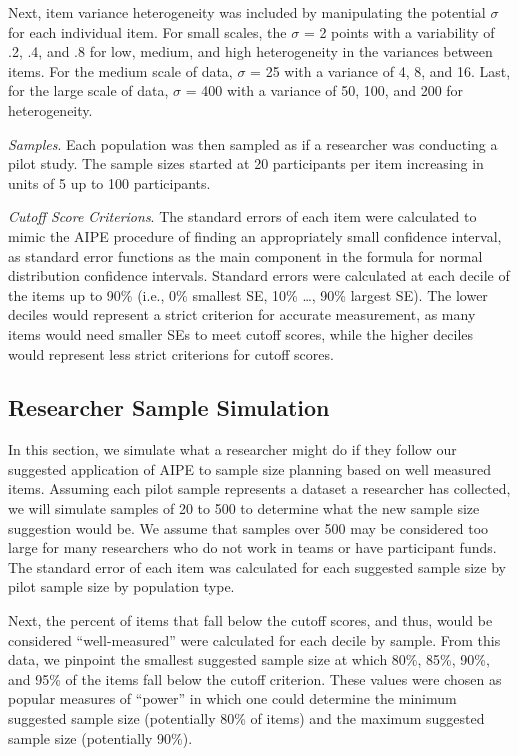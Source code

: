 \documentclass[
  man]{apa6}
\begin{document}
Next, item variance heterogeneity was included by manipulating the potential \(\sigma\) for each individual item. For small scales, the \(\sigma\) = 2 points with a variability of .2, .4, and .8 for low, medium, and high heterogeneity in the variances between items. For the medium scale of data, \(\sigma\) = 25 with a variance of 4, 8, and 16. Last, for the large scale of data, \(\sigma\) = 400 with a variance of 50, 100, and 200 for heterogeneity.

\emph{Samples}. Each population was then sampled as if a researcher was conducting a pilot study. The sample sizes started at 20 participants per item increasing in units of 5 up to 100 participants.

\emph{Cutoff Score Criterions}. The standard errors of each item were calculated to mimic the AIPE procedure of finding an appropriately small confidence interval, as standard error functions as the main component in the formula for normal distribution confidence intervals. Standard errors were calculated at each decile of the items up to 90\% (i.e., 0\% smallest SE, 10\% \ldots, 90\% largest SE). The lower deciles would represent a strict criterion for accurate measurement, as many items would need smaller SEs to meet cutoff scores, while the higher deciles would represent less strict criterions for cutoff scores.

\hypertarget{researcher-sample-simulation}{%
\subsection{Researcher Sample Simulation}\label{researcher-sample-simulation}}

In this section, we simulate what a researcher might do if they follow our suggested application of AIPE to sample size planning based on well measured items. Assuming each pilot sample represents a dataset a researcher has collected, we will simulate samples of 20 to 500 to determine what the new sample size suggestion would be. We assume that samples over 500 may be considered too large for many researchers who do not work in teams or have participant funds. The standard error of each item was calculated for each suggested sample size by pilot sample size by population type.

Next, the percent of items that fall below the cutoff scores, and thus, would be considered ``well-measured'' were calculated for each decile by sample. From this data, we pinpoint the smallest suggested sample size at which 80\%, 85\%, 90\%, and 95\% of the items fall below the cutoff criterion. These values were chosen as popular measures of ``power'' in which one could determine the minimum suggested sample size (potentially 80\% of items) and the maximum suggested sample size (potentially 90\%).
\end{document}
